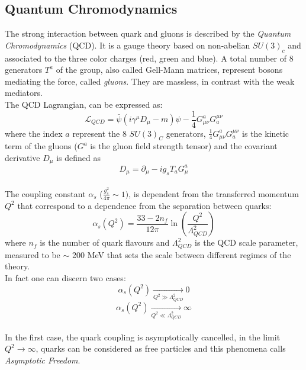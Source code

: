 \subsection{Quantum Chromodynamics} 

The strong interaction between quark and gluons is described by the \textit{Quantum Chromodynamics} (QCD). It is a gauge theory based on non-abelian 
$SU(3)_{c}$\footnotemark {}
and associated to the three color charges (red, green and blue). A total number of 8 generators $T^a$ of the group, also called Gell-Mann matrices,
represent bosons mediating the force, called \textit{gluons}. They are massless, in contrast with the weak mediators.
\vspace{\baselineskip}
\\The QCD Lagrangian, can be expressed as:
\begin{equation}
\mathcal{L}_{QCD}  =  \bar{\psi}(i\gamma^{\mu}D_{\mu}-m)\psi-\frac{1}{4}G^{a}_{\mu\nu}G^{\mu\nu}_a
\end{equation}
where the index $a$ represent the 8 $SU(3)_C$ generators,  $\frac{1}{4}G^{a}_{\mu\nu}G^{\mu\nu}_a$ is the kinetic term of the gluons ($G^a$ is the gluon field strength tensor) and the covariant derivative $D_{\mu}$ is defined as
\begin{equation}
D_{\mu}=\partial_{\mu}-ig_{s}T_{a}G^{a}_{\mu}
\end{equation}
\vspace{\baselineskip}
\\The coupling constant $\alpha_{s}$ ($\frac{g^2_s}{4\pi}\sim 1)$, is dependent from the transferred momentum $Q^2$ that correspond to a dependence from the separation between quarks:
\begin{equation}
\alpha_{s}(Q^2)= \frac{33-2n_f}{12\pi}   \ln\left( \frac{Q^2}{\Lambda^{2}_{QCD}}   \right)
\end{equation}
where $n_f$ is the number of quark flavours and $\Lambda^{2}_{QCD}$ is the QCD scale parameter, measured to be $\sim$ 200 MeV that sets the scale 
between different regimes of the theory. \\
In fact one can discern two cases:
\[\alpha_{s}(Q^2)\xrightarrow[Q^{2} \gg \Lambda^{2}_{QCD} ]{}0\]
\[\alpha_{s}(Q^2)\xrightarrow[Q^{2} \ll \Lambda^{2}_{QCD} ]{}\infty\]
\\In the first case, the quark coupling is asymptotically cancelled, in the limit $Q^{2}\rightarrow \infty$, quarks can be considered as free particles and this phenomena calls \textit{Asymptotic Freedom}.
